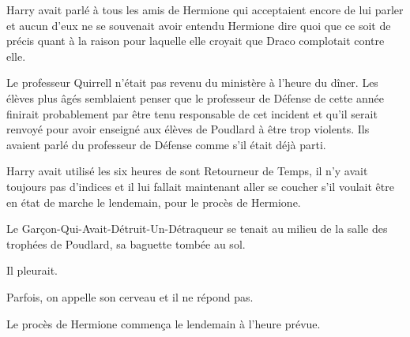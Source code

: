 Harry avait parlé à tous les amis de Hermione qui acceptaient encore de lui parler et aucun d'eux ne se souvenait avoir entendu Hermione dire quoi que ce soit de précis quant à la raison pour laquelle elle croyait que Draco complotait contre elle.

Le professeur Quirrell n'était pas revenu du ministère à l'heure du dîner. Les élèves plus âgés semblaient penser que le professeur de Défense de cette année finirait probablement par être tenu responsable de cet incident et qu'il serait renvoyé pour avoir enseigné aux élèves de Poudlard à être trop violents. Ils avaient parlé du professeur de Défense comme s'il était déjà parti.

Harry avait utilisé les six heures de sont Retourneur de Temps, il n'y avait toujours pas d'indices et il lui fallait maintenant aller se coucher s'il voulait être en état de marche le lendemain, pour le procès de Hermione.

Le Garçon-Qui-Avait-Détruit-Un-Détraqueur se tenait au milieu de la salle des trophées de Poudlard, sa baguette tombée au sol.

Il pleurait.

Parfois, on appelle son cerveau et il ne répond pas.

Le procès de Hermione commença le lendemain à l'heure prévue.

